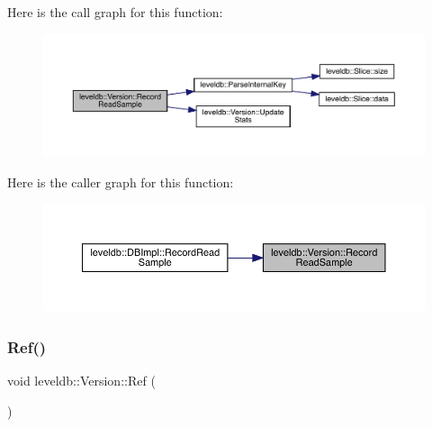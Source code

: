 Here is the call graph for this function\+:
\nopagebreak
\begin{figure}[H]
\begin{center}
\leavevmode
\includegraphics[width=350pt]{classleveldb_1_1_version_a8b9e51b3d0503fe5868f656356557ded_cgraph}
\end{center}
\end{figure}
Here is the caller graph for this function\+:
\nopagebreak
\begin{figure}[H]
\begin{center}
\leavevmode
\includegraphics[width=350pt]{classleveldb_1_1_version_a8b9e51b3d0503fe5868f656356557ded_icgraph}
\end{center}
\end{figure}
\mbox{\label{classleveldb_1_1_version_ad237b446c7f7d9e63c4b7c162d6f0064}} 
\subsubsection{\texorpdfstring{Ref()}{Ref()}}
{\footnotesize\ttfamily void leveldb\+::\+Version\+::\+Ref (\begin{DoxyParamCaption}{ }\end{DoxyParamCaption})}

